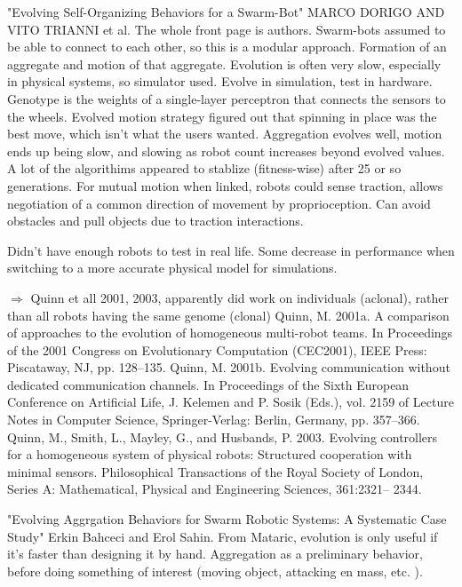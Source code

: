 \documentclass[]{article}
\begin{document}
"Evolving Self-Organizing Behaviors for a Swarm-Bot" \cite{dorigo2004evolving} MARCO DORIGO AND VITO TRIANNI et al. The whole front page is authors. Swarm-bots assumed to be able to connect to each other, so this is a modular approach. Formation of an aggregate and motion of that aggregate. Evolution is often very slow, especially in physical systems, so simulator used. Evolve in simulation, test in hardware. Genotype is the weights of a single-layer perceptron that connects the sensors to the wheels. Evolved motion strategy figured out that spinning in place was the best move, which isn't what the users wanted. Aggregation evolves well, motion ends up being slow, and slowing as robot count increases beyond evolved values. A lot of the algorithims appeared to stablize (fitness-wise) after 25 or so generations. For mutual motion when linked, robots could sense traction, allows negotiation of a common direction of movement by proprioception. Can avoid obstacles and pull objects due to traction interactions. 

Didn't have enough robots to test in real life. Some decrease in performance when switching to a more accurate physical model for simulations. 

$\Rightarrow$ Quinn et all 2001, 2003, apparently did work on individuals (aclonal), rather than all robots having the same genome (clonal) Quinn, M. 2001a. A comparison of approaches to the evolution of homogeneous multi-robot teams. In Proceedings of the 2001 Congress on Evolutionary Computation (CEC2001), IEEE Press: Piscataway, NJ, pp. 128–135.
Quinn, M. 2001b. Evolving communication without dedicated communication channels. In Proceedings of the Sixth European Conference on Artificial Life, J. Kelemen and P. Sosik (Eds.), vol. 2159 of Lecture Notes in Computer Science, Springer-Verlag: Berlin, Germany, pp. 357–366.
Quinn, M., Smith, L., Mayley, G., and Husbands, P. 2003. Evolving controllers for a homogeneous system of physical robots: Structured cooperation with minimal sensors. Philosophical Transactions of the Royal Society of London, Series A: Mathematical, Physical and Engineering Sciences, 361:2321– 2344.

"Evolving Aggrgation Behaviors for Swarm Robotic Systems: A Systematic Case Study" \cite{bahgecci2005evolving} Erkin Bahceci and Erol Sahin. From Mataric, evolution is only useful if it's faster than designing it by hand. Aggregation as a preliminary behavior, before doing something of interest (moving object, attacking en mass, etc. ). 
\end{document}
